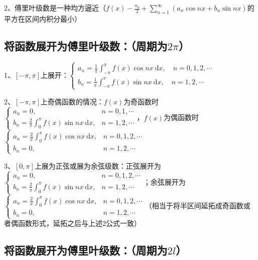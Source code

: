 2、傅里叶级数是一种均方逼近（$f(x) - \frac{a_{0}}{2}+\sum_{n=1}^{\infty}\left(a_{n} \cos n x+b_{n} \sin n x\right)$的平方在区间内积分最小）



\subsection{将函数展开为傅里叶级数：（周期为$2\pi$）}

1、$[-\pi, \pi]$上展开：$\left\{\begin{array}{l} a_{n}=\frac{1}{\pi} \int_{-\pi}^{\pi} f(x) \cos n x \mathrm{~d} x, \quad n=0,1,2, \cdots \\ b_{n}=\frac{1}{\pi} \int_{-\pi}^{\pi} f(x) \sin n x \mathrm{~d} x, \quad n=1,2, \cdots \end{array}\right.$

2、$[-\pi, \pi]$上奇偶函数的情况：$f(x)$为奇函数时$\begin{cases}a_{n}=0, & n=0,1, \cdots \\ b_{n}=\frac{2}{\pi} \int_{0}^{\pi} f(x) \sin n x \mathrm{~d} x, & n=1,2, \cdots\end{cases}$，$f(x)$为偶函数时$\begin{cases}a_{n}=\frac{2}{\pi} \int_{0}^{\pi} f(x) \cos n x \mathrm{~d} x, & n=0,1,2, \cdots \\ b_{n}=0, & n=1,2, \cdots\end{cases}$

3、$[0, \pi]$上展为正弦或展为余弦级数：正弦展开为$\begin{cases}a_{n}=0, & n=0,1,2, \cdots \\ b_{n}=\frac{2}{\pi} \int_{0}^{\pi} f(x) \sin n x \mathrm{~d} x, & n=1,2, \cdots\end{cases}$；余弦展开为$\begin{cases}a_{n}=\frac{2}{\pi} \int_{0}^{\pi} f(x) \cos n x \mathrm{~d} x, & n=0,1,2, \cdots \\ b_{n}=0, & n=1,2, \cdots\end{cases}$（相当于将半区间延拓成奇函数或者偶函数形式，延拓之后与上述2公式一致）



\subsection{将函数展开为傅里叶级数：（周期为$2l$）}


